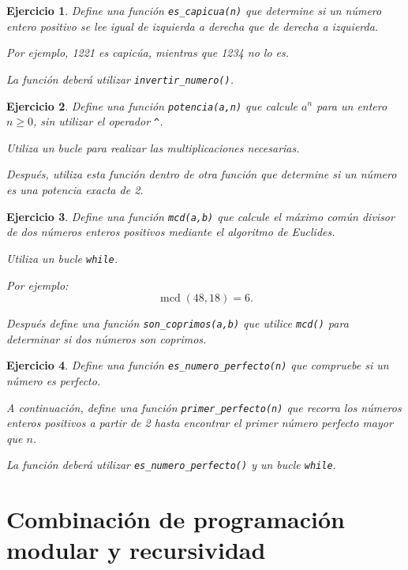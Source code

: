\documentclass[11pt,a4paper]{article}
\theoremstyle{exercise}
\newtheorem{exercise}{Ejercicio}
\begin{document}
\begin{exercise} Define una función \texttt{es\_capicua(n)} que determine si un número entero positivo se lee igual de izquierda a derecha que de derecha a izquierda.

Por ejemplo, 1221 es capicúa, mientras que 1234 no lo es.

La función deberá utilizar \texttt{invertir\_numero()}. \end{exercise}

\begin{exercise} Define una función \texttt{potencia(a,n)} que calcule $a^n$ para un entero $n\geq 0$, sin utilizar el operador \texttt{\^}.

Utiliza un bucle para realizar las multiplicaciones necesarias.

Después, utiliza esta función dentro de otra función que determine si un número es una potencia exacta de 2. \end{exercise}

\begin{exercise} Define una función \texttt{mcd(a,b)} que calcule el máximo común divisor de dos números enteros positivos mediante el algoritmo de Euclides.

Utiliza un bucle \texttt{while}.

Por ejemplo: \[ \operatorname{mcd}(48,18)=6. \]

Después define una función \texttt{son\_coprimos(a,b)} que utilice \texttt{mcd()} para determinar si dos números son coprimos. \end{exercise}

\begin{exercise} Define una función \texttt{es\_numero\_perfecto(n)} que compruebe si un número es perfecto.

A continuación, define una función \texttt{primer\_perfecto(n)} que recorra los números enteros positivos a partir de 2 hasta encontrar el primer número perfecto mayor que $n$.

La función deberá utilizar \texttt{es\_numero\_perfecto()} y un bucle \texttt{while}. \end{exercise}



\section{Combinación de programación modular y recursividad} 
\end{document}

